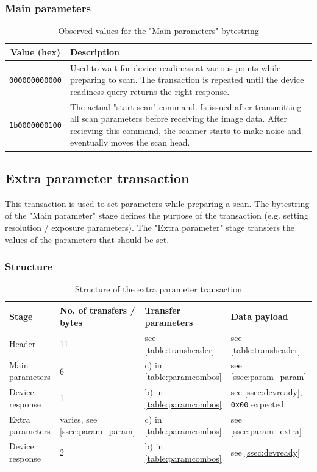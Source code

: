 \documentclass{article}
\begin{document}
\subsubsection{Main parameters}
\label{ssec:basic_param}

\begin{table}[H]
  \caption{Observed values for the "Main parameters" bytestring}
  \centering
  \begin{tabular}{c | p{7cm}}
    Value (hex) & Description \\ \hline
    {\tt 000000000000} & Used to wait for device readiness at various points while preparing to scan. The transaction is repeated
                         until the device readiness query returns the right response.
                         \\
    {\tt 1b0000000100} & The actual "start scan" command. Is issued after transmitting all scan parameters
                         before receiving the image data. After recieving this command, the scanner
                         starts to make noise and eventually moves the scan head. \\
  \end{tabular}
\end{table}

\subsection{Extra parameter transaction}

This transaction is used to set parameters while preparing a scan.
The bytestring of the "Main parameter" stage defines the purpose of the transaction
(e.g. setting resolution / exposure parameters). The "Extra parameter" stage
transfers the values of the parameters that should be set.

\subsubsection{Structure}

\begin{table}[H]
  \caption{Structure of the extra parameter transaction}
  \centering
  \begin{tabular}{p{3cm} | p{1.5cm} | p{3cm} | p{3cm}}
    Stage & No. of transfers / bytes & Transfer parameters & Data payload \\ \hline
    
    Header & 11 & see \autoref{table:transheader} & see \autoref{table:transheader} \\
    Main parameters & 6 & c) in \autoref{table:paramcombos} & see \ref{ssec:param_param} \\
    Device response & 1 & b) in \autoref{table:paramcombos} & see \ref{ssec:devready}, {\tt 0x00} expected \\
    Extra parameters & varies, see \ref{ssec:param_param} & c) in \autoref{table:paramcombos} & see \ref{ssec:param_extra} \\
    Device response & 2 & b) in \autoref{table:paramcombos} & see \ref{ssec:devready} \\
  \end{tabular}
\end{table}
\end{document}
